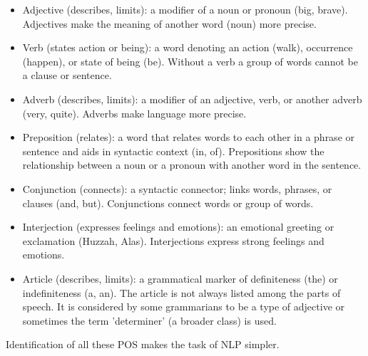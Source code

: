 \begin{multicols*}{2}
\begin{itemize}
			\item Adjective (describes, limits): a modifier of a noun or pronoun (big, brave). Adjectives make the meaning of another word (noun) more precise.
			\item Verb (states action or being): a word denoting an action (walk), occurrence (happen), or state of being (be). Without a verb a group of words cannot be a clause or sentence.
			\item Adverb (describes, limits): a modifier of an adjective, verb, or another adverb (very, quite). Adverbs make language more precise.
			\item Preposition (relates): a word that relates words to each other in a phrase or sentence and aids in syntactic context (in, of). Prepositions show the relationship between a noun or a pronoun with another word in the sentence.
			\item Conjunction (connects): a syntactic connector; links words, phrases, or clauses (and, but). Conjunctions connect words or group of words.
			\item Interjection (expresses feelings and emotions): an emotional greeting or exclamation (Huzzah, Alas). Interjections express strong feelings and emotions.
			\item Article (describes, limits): a grammatical marker of definiteness (the) or indefiniteness (a, an). The article is not always listed among the parts of speech. It is considered by some grammarians to be a type of adjective or sometimes the term 'determiner' (a broader class) is used.
		\end{itemize}
		Identification of all these \gls{POS} makes the task of \gls{NLP} simpler.
		

\end{multicols*}
